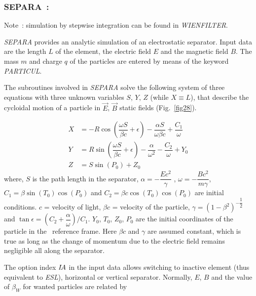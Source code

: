 \newpage

\subsubsection*{SEPARA~: \SEPARATitl}\label{SEPARA} 
\medskip 

\noindent Note~: simulation by stepwise integration can be found in \textsl{WIENFILTER}.

\medskip

\textsl{SEPARA}  provides an analytic simulation of an electrostatic separator. 
Input data are the length $ L $ of the element, the electric field $ E $ and
the magnetic field $ B $. The mass $ m $ and charge $ q $ of the particles are
entered by means of the keyword \textsl{PARTICUL}.  
\medskip

\noindent The subroutines involved in \textsl{SEPARA} solve the following
system of three equations with three unknown variables $ S$, $Y$, $Z $ (while  $ X\equiv L $), that 
describe the cycloidal motion of a particle in $ \vec  E$,  $ \vec  B $ static
fields (Fig.~\ref{fig28}).   

\begin{align*}
	X &   =   -R  \cos \left( \dfrac{\omega S }{ \beta c} + \epsilon \right) 
	         -  \dfrac{\alpha S }{ \omega\beta c} + \dfrac{C_1 }{ \omega} \\
	Y &   =     R \sin  \left(\dfrac{\omega S }{ \beta c} + \epsilon \right) - 
	         \dfrac{\alpha }{ \omega^ 2} - \dfrac{C_2 }{ \omega}  + Y_0  \\
	Z &   =  S \sin (P_0)+Z_0   
\end{align*}
%
 where, $ S $ is the path length in the separator, $\alpha =-\dfrac{Ec^2 }{ \gamma}$ ,
   $   \omega =-\dfrac{Bc^2 }{m\gamma}$, $   C_1=\beta \sin (T_0) \cos (P_0) $ 
and $ C_2=\beta c  \cos (T_0) \cos (P_0) $ are initial conditions. 
$c$ = velocity of light, $ \beta c$ = velocity of the particle,  
$ \gamma =(1-\beta^ 2)^{-\dfrac{1 }{ 2}} $ 
and  $\tan \epsilon  =   (C_2+ \dfrac{\alpha}{\omega})/C_1 $.   $ Y_0$,   $ T_0$,  
$Z_0$,  $ P_0 $ are the initial 
coordinates of the particle in the \zgou\ reference  frame.  Here 
$\beta c $ and $\gamma$ are assumed constant, which is true as long as the change of momentum
due to the electric field remains negligible all along the separator.  
\medskip

\noindent The option index $I\!A$ in the input data allows switching to inactive
element (thus equivalent to \textsl{ESL}), horizontal or vertical separator.  
Normally, $ E$,  $B $ and the value of $ \beta_W $ for wanted particles are related by 

